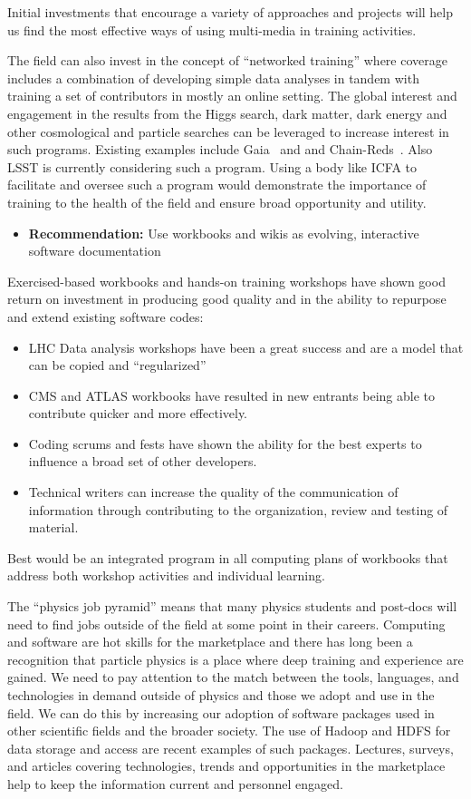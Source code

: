 Initial investments that encourage a variety of approaches and
projects will help us find the most effective ways of using multi-media
in training activities.

The field can also invest in the concept  of ``networked training''
where coverage includes  a combination of developing simple data
analyses in tandem with training a set of contributors in mostly
an online setting. The global interest and engagement in the results
from the Higgs search, dark matter, dark energy and other cosmological
and particle searches can be leveraged to increase interest in such
programs.  Existing examples include Gaia~\cite{GAIA} and and
Chain-Reds~\cite{CHAINREDS}. Also LSST is currently considering
such a program. Using a body like ICFA to facilitate and oversee
such a program would demonstrate the importance of training to the
health of the field and ensure broad  opportunity and utility.

\begin{itemize}
\item[] {\bf Recommendation:} Use workbooks and wikis as evolving, interactive software documentation
\end{itemize}

Exercised-based workbooks and hands-on training workshops have shown
good return on investment in producing good quality and in the
ability to repurpose and extend  existing software codes:
\begin{itemize}
\item LHC Data analysis workshops have been a great success and are a model that can be copied and ``regularized''
\item CMS and ATLAS workbooks have resulted in new entrants being able to contribute quicker and more effectively.
\item Coding scrums and fests have shown the ability for the best experts to influence a broad set of other developers.
\item Technical writers can increase the quality of the communication of information through contributing to the organization, review and testing of material.
\end{itemize}

Best would be an integrated program in all computing plans of workbooks that address both workshop activities and individual learning.


The ``physics job pyramid'' means that many physics students and
post-docs will need to find jobs outside of the field at some point
in their careers. Computing and software are hot skills for the
marketplace and there has long been a recognition that particle
physics is a place where deep training and experience are gained.
We need to pay attention to the match between the tools, languages,
and technologies in demand outside of physics and those we adopt
and use in the field. We can do this by increasing our adoption of
software packages used in other scientific fields and the broader
society. The use of Hadoop and HDFS for data storage and access are
recent examples of such packages.   Lectures, surveys, and articles
covering technologies, trends and opportunities in the marketplace
help to keep the information current and personnel engaged.

